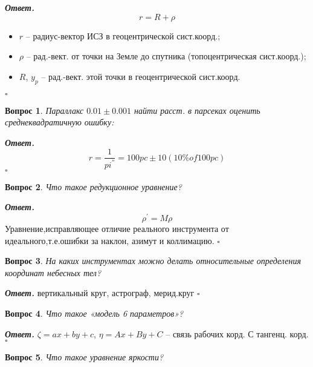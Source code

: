 \documentclass[12pt]{article}
\newtheorem{problem}{Вопрос}
\newenvironment{solution}[1][\it{Ответ}]{\textbf{#1. } }{$\square$}
\begin{document}
		\begin{solution}
			$$r = R + \rho$$
			\begin{itemize}
				\item $r$ -- радиус-вектор ИСЗ в геоцентрической сист.коорд.;
				\item $\rho$ -- рад.-вект. от точки на Земле до спутника (топоцентрическая сист.коорд.);
				\item $R$, $y_p$ -- рад.-вект. этой точки в геоцентрической сист.коорд.
			\end{itemize}
		\end{solution}
		
		\begin{problem}
			Параллакс $0.01 \pm 0.001$ найти расст. в парсеках оценить среднеквадратичную ошибку:
		\end{problem}
		
		\begin{solution}
			$$r = \frac{1}{pi^{''}} = 100 pc \pm 10 (10\% of 100pc)$$
		\end{solution}
		
		
		\begin{problem}
			Что такое редукционное уравнение?
		\end{problem}
		
		\begin{solution}
			$$\rho^{'}= M\rho$$ 
Уравнение,исправляющее отличие
			реального инструмента от идеального,т.е.ошибки за
			наклон, азимут и коллимацию.
		\end{solution}
		
		\begin{problem}
			На каких инструментах можно
			делать относительные определения
			координат небесных тел? 
		\end{problem}
		
		\begin{solution}
			вертикальный круг, астрограф,
			мерид.круг
		\end{solution}
		
		\begin{problem}
			Что такое «модель 6
			параметров»?
		\end{problem}
		
		\begin{solution}
			$\zeta=ax+by+c$, $\eta=Ax+By+C$
			– связь рабочих корд. С тангенц. корд.
		\end{solution}
		
		\begin{problem}
			Что такое уравнение яркости?
		\end{problem}
		
\end{document}
